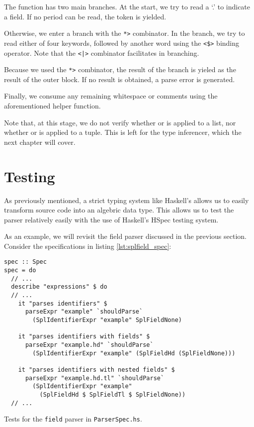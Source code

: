 The  function has two main branches.
At the start, we try to read a `.' to indicate a field.
If no period can be read, the  token is yielded.

Otherwise, we enter a branch with the \texttt{*>} combinator.
In the branch, we try to read either of four keywords, followed by another word using the \texttt{<\$>} binding operator.
Note that the \texttt{<|>} combinator facilitates in branching.

Because we used the \texttt{*>} combinator, the result of the branch is yieled as the result of the outer block. If no result is obtained, a parse error is generated.

Finally, we consume any remaining whitespace or comments using the aforementioned  helper function.

Note that, at this stage, we do not verify whether  or  is applied to a list, nor whether  or  is applied to a tuple.
This is left for the type inferencer, which the next chapter will cover.

\section{Testing}

As previously mentioned, a strict typing system like Haskell's allows us to easily transform source code into an algebric data type.
This allows us to test the parser relatively easily with the use of Haskell's HSpec testing system.

As an example, we will revisit the field parser discussed in the previous section. Consider the specifications in listing \ref{lst:splfield_spec}:

\begin{listing}
\begin{verbatim}
spec :: Spec
spec = do
  // ...
  describe "expressions" $ do
  // ...
    it "parses identifiers" $
      parseExpr "example" `shouldParse`
        (SplIdentifierExpr "example" SplFieldNone)

    it "parses identifiers with fields" $
      parseExpr "example.hd" `shouldParse`
        (SplIdentifierExpr "example" (SplFieldHd (SplFieldNone)))

    it "parses identifiers with nested fields" $
      parseExpr "example.hd.tl" `shouldParse`
        (SplIdentifierExpr "example"
          (SplFieldHd $ SplFieldTl $ SplFieldNone))
  // ...
\end{verbatim}
\caption{Tests for the \texttt{field} parser in \texttt{ParserSpec.hs}.}
\label{lst:splfield_spec}
\end{listing}

